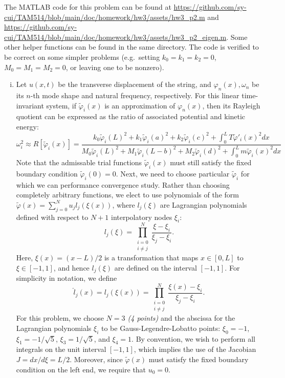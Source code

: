 The MATLAB code for this problem can be found at \url{https://github.com/sy-cui/TAM514/blob/main/doc/homework/hw3/assets/hw3_p2.m} and \url{https://github.com/sy-cui/TAM514/blob/main/doc/homework/hw3/assets/hw3_p2_eigen.m}. 
Some other helper functions can be found in the same directory. 
The code is verified to be correct on some simpler problems (e.g.~setting $k_0 = k_1 = k_2 = 0$, $M_0 = M_1 = M_2 = 0$, or leaving one to be nonzero).
\begin{enumerate}[(i)]
\item { %
    Let $u(x, t)$ be the transverse displacement of the string, and $\varphi_n(x), \omega_n$ be its $n$-th mode shape and natural frequency, respectively.
    For this linear time-invariant system, if $\tilde{\varphi}_i(x)$ is an approximation of $\varphi_n(x)$, then its Rayleigh quotient can be expressed as the ratio of associated potential and kinetic energy:
    \begin{equation}\label{eqn:hw3_p2_rq}
        \omega_i^2 \approx R[\tilde{\varphi}_i(x)] = \frac{
            k_0 {\tilde{\varphi}_i(L)}^2 + 
            k_1 {\tilde{\varphi}_i(a)}^2 + 
            k_2 {\tilde{\varphi}_i(c)}^2 + 
            \int_0^L T {\tilde{\varphi}'_i(x)}^2 dx 
        }{
            M_0 {\tilde{\varphi}_i(L)}^2 + 
            M_1 {\tilde{\varphi}_i(L-b)}^2 + 
            M_2 {\tilde{\varphi}_i(d)}^2 + 
            \int_0^L m {\tilde{\varphi}_i(x)}^2 dx
        }
    \end{equation}
    Note that the admissable trial functions $\tilde{\varphi}_i(x)$ must still satisfy the fixed boundary condition $\tilde{\varphi}_i(0) = 0$. 
    Next, we need to choose particular $\tilde{\varphi}_i$ for which we can performance convergence study.
    Rather than choosing completely arbitrary functions, we elect to use polynomials of the form $\tilde{\varphi}(x) = \sum_{j=0}^N u_j l_j(\xi(x))$, where $l_j(\xi)$ are Lagrangian polynomials defined with respect to $N+1$ interpolatory nodes $\xi_i$:
    \begin{equation}
        l_j(\xi) = \prod_{\substack{i=0 \\ i\neq j}}^N \frac{\xi - \xi_i}{\xi_j - \xi_i}.
    \end{equation}
    Here, $\xi(x) = (x - L)/2$ is a transformation that maps $x \in [0, L]$ to $\xi \in [-1, 1]$, and hence $l_j(\xi)$ are defined on the interval $[-1, 1]$.
    For simplicity in notation, we define 
    \begin{equation}
        \hat{l}_j(x) = l_j(\xi(x)) = \prod_{\substack{i=0 \\ i\neq j}}^N \frac{\xi(x) - \xi_i}{\xi_j - \xi_i}.
    \end{equation}
    For this problem, we choose \emph{$N = 3$ (4 points)} and the abscissa for the Lagrangian polynomials $\xi_i$ to be Gauss-Legendre-Lobatto points: $\xi_0 = -1$, $\xi_1 = -1/\sqrt{5}$, $\xi_3 = 1/\sqrt{5}$, and $\xi_4 = 1$.
    By convention, we wish to perform all integrals on the unit interval $[-1, 1]$, which implies the use of the Jacobian $J = dx / d\xi = L/2$. 
    Moreover, since $\tilde{\varphi}(x)$ must satisfy the fixed boundary condition on the left end, we require that $u_0 = 0$. 

}
\end{enumerate}
